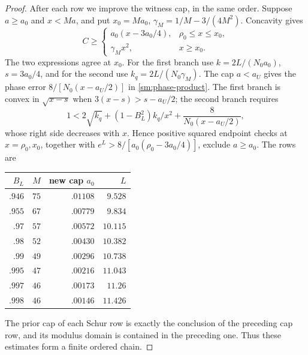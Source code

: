\documentclass[11pt,reqno]{amsart}
\numberwithin{equation}{section}
\theoremstyle{definition}
\theoremstyle{remark}
\begin{document}
\begin{proof}
After each row we improve the witness cap, in the same order.
Suppose $a\ge a_0$ and $x<Ma$, and put $x_0=Ma_0$,
$\gamma_M=1/M-3/(4M^2)$. Concavity gives
\begin{equation}\label{sm:joint-C}
 C\ge
 \begin{cases}
 a_0(x-3a_0/4),&\rho_0\le x\le x_0,\\
 \gamma_Mx^2,&x\ge x_0.
 \end{cases}
\end{equation}
The two expressions agree at $x_0$. For the first branch use
$k=2L/(N_0a_0)$, $s=3a_0/4$, and for the second use
$k_q=2L/(N_0\gamma_M)$. The cap $a<a_U$ gives
the phase error $8/[N_0(x-a_U/2)]$ in
\eqref{sm:phase-product}. The first branch is convex in
$\sqrt{x-s}$ when $3(x-s)>s-a_U/2$; the second branch requires
\[
 1<2\sqrt{k_q}+(1-B_L^2)k_q/x^2+\frac8{N_0(x-a_U/2)},
\]
whose right side decreases with $x$.
Hence positive squared endpoint checks at $x=\rho_0,x_0$, together
with $e^L>8/[a_0(\rho_0-3a_0/4)]$, exclude $a\ge a_0$.
The rows are
\begin{center}\small
\begin{tabular}{rrrr}
\toprule
$B_L$&$M$&new cap $a_0$&$L$\\\midrule
$.946$&$75$&$.01108$&$9.528$\\
$.955$&$67$&$.00779$&$9.834$\\
$.97$&$57$&$.00572$&$10.115$\\
$.98$&$52$&$.00430$&$10.382$\\
$.99$&$49$&$.00296$&$10.738$\\
$.995$&$47$&$.00216$&$11.043$\\
$.997$&$46$&$.00173$&$11.26$\\
$.998$&$46$&$.00146$&$11.426$\\\bottomrule
\end{tabular}
\end{center}
The prior cap of each Schur row is exactly the conclusion of the
preceding cap row, and its modulus domain is contained in the
preceding one. Thus these estimates form a finite ordered chain.


\end{proof}
\end{document}
